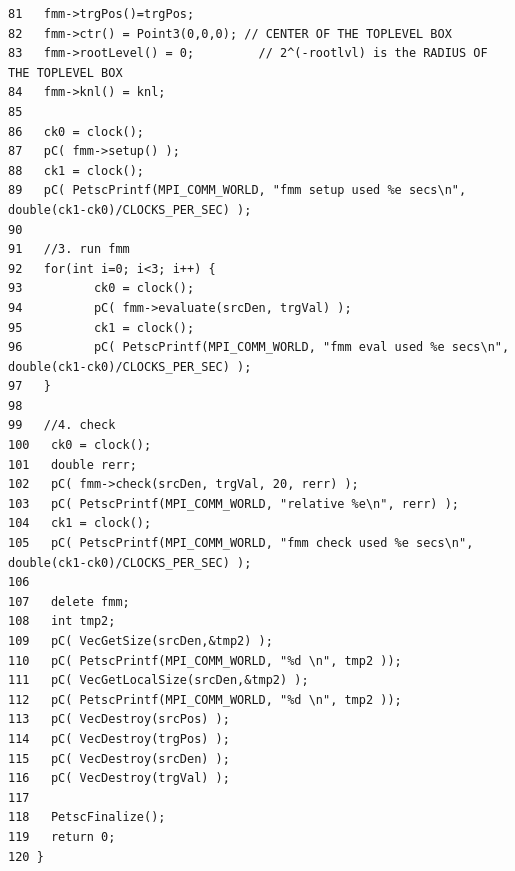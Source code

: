 \begin{verbatim}
81   fmm->trgPos()=trgPos;
82   fmm->ctr() = Point3(0,0,0); // CENTER OF THE TOPLEVEL BOX
83   fmm->rootLevel() = 0;         // 2^(-rootlvl) is the RADIUS OF THE TOPLEVEL BOX
84   fmm->knl() = knl;
85   
86   ck0 = clock();
87   pC( fmm->setup() );
88   ck1 = clock();  
89   pC( PetscPrintf(MPI_COMM_WORLD, "fmm setup used %e secs\n", double(ck1-ck0)/CLOCKS_PER_SEC) );
90   
91   //3. run fmm
92   for(int i=0; i<3; i++) {
93          ck0 = clock();
94          pC( fmm->evaluate(srcDen, trgVal) );
95          ck1 = clock();
96          pC( PetscPrintf(MPI_COMM_WORLD, "fmm eval used %e secs\n", double(ck1-ck0)/CLOCKS_PER_SEC) );
97   }
98   
99   //4. check
100   ck0 = clock();
101   double rerr;
102   pC( fmm->check(srcDen, trgVal, 20, rerr) );
103   pC( PetscPrintf(MPI_COMM_WORLD, "relative %e\n", rerr) );
104   ck1 = clock();
105   pC( PetscPrintf(MPI_COMM_WORLD, "fmm check used %e secs\n", double(ck1-ck0)/CLOCKS_PER_SEC) );
106   
107   delete fmm;
108   int tmp2;
109   pC( VecGetSize(srcDen,&tmp2) );
110   pC( PetscPrintf(MPI_COMM_WORLD, "%d \n", tmp2 ));
111   pC( VecGetLocalSize(srcDen,&tmp2) );
112   pC( PetscPrintf(MPI_COMM_WORLD, "%d \n", tmp2 ));
113   pC( VecDestroy(srcPos) );
114   pC( VecDestroy(trgPos) );
115   pC( VecDestroy(srcDen) );
116   pC( VecDestroy(trgVal) );
117   
118   PetscFinalize();
119   return 0;
120 }
\end{verbatim}\normalsize 


